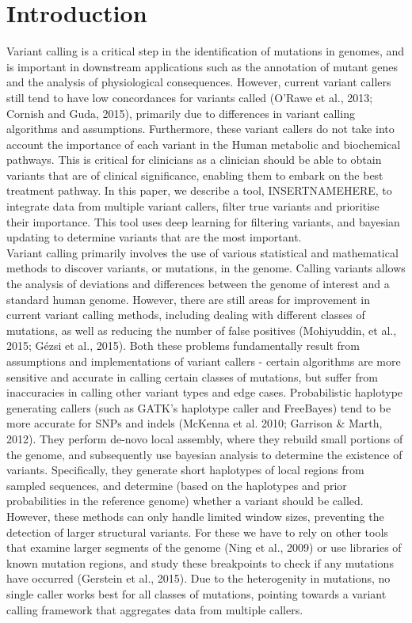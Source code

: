 \documentclass{article}
\begin{document}
\section{Introduction}
Variant calling is a critical step in the identification of mutations in genomes, and is important in downstream applications such as the annotation of mutant genes and the analysis of physiological consequences. However, current variant callers still tend to have low concordances for variants called (O'Rawe et al., 2013; Cornish and Guda, 2015), primarily due to differences in variant calling algorithms and assumptions. Furthermore, these variant callers do not take into account the importance of each variant in the Human metabolic and biochemical pathways. This is critical for clinicians as a clinician should be able to obtain variants that are of clinical significance, enabling them to embark on the best treatment pathway. In this paper, we describe a tool, INSERTNAMEHERE, to integrate data from multiple variant callers, filter true variants and prioritise their importance. This tool uses deep learning for filtering variants, and bayesian updating to determine variants that are the most important.\\

Variant calling primarily involves the use of various statistical and mathematical methods to discover variants, or mutations, in the genome. Calling variants allows the analysis of deviations and differences between the genome of interest and a standard human genome. However, there are still areas for improvement in current variant calling methods, including dealing with different classes of mutations, as well as reducing the number of false positives (Mohiyuddin, et al., 2015; Gézsi et al., 2015). Both these problems fundamentally result from assumptions and implementations of variant callers - certain algorithms are more sensitive and accurate in calling certain classes of mutations, but suffer from inaccuracies in calling other variant types and edge cases. Probabilistic haplotype generating callers (such as GATK's haplotype caller and FreeBayes) tend to be more accurate for SNPs and indels (McKenna et al. 2010; Garrison \& Marth, 2012). They perform de-novo local assembly, where they rebuild small portions of the genome, and subsequently use bayesian analysis to determine the existence of variants. Specifically, they generate short haplotypes of local regions from sampled sequences, and determine (based on the haplotypes and prior probabilities in the reference genome) whether a variant should be called. However, these methods can only handle limited window sizes, preventing the detection of larger structural variants. For these we have to rely on other tools that examine larger segments of the genome (Ning et al., 2009) or use libraries of known mutation regions, and study these breakpoints to check if any mutations have occurred (Gerstein et al., 2015). Due to the heterogenity in mutations, no single caller works best for all classes of mutations, pointing towards a variant calling framework that aggregates data from multiple callers.\\
\end{document}
